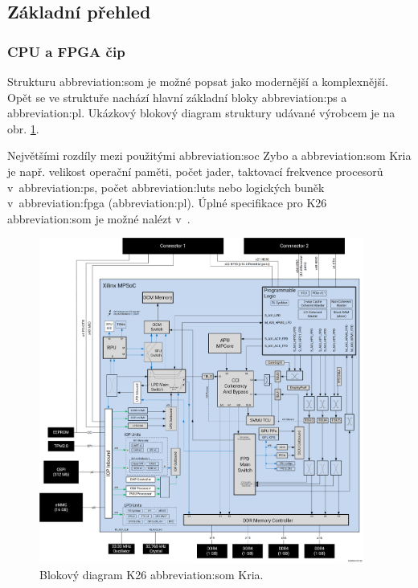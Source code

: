 \documentclass[a4paper, twoside, 11pt]{article}
\newcommand{\fbar}{\FloatBarrier}
\begin{document}
				\subsection{Základní přehled}
					\subsubsection{CPU a FPGA čip}
						Strukturu \gls{abbreviation:som} je možné popsat jako modernější a komplexnější. Opět se ve struktuře nachází hlavní základní bloky \gls{abbreviation:ps} a \gls{abbreviation:pl}. Ukázkový blokový diagram struktury udávané výrobcem je na obr. \ref{fig:xilinx-kria-k26-block-diagram}.\par
						Největšími rozdíly mezi použitými \gls{abbreviation:soc} Zybo a \gls{abbreviation:som} Kria je např. velikost operační paměti, počet jader, taktovací frekvence procesorů v~\gls{abbreviation:ps}, počet \gls{abbreviation:luts} nebo logických buněk v~\gls{abbreviation:fpga} (\gls{abbreviation:pl}). Úplné specifikace pro K26 \gls{abbreviation:som} je možné nalézt v~\cite{kria-k26-som-ds}.

						\begin{figure}[htbp!]
							\centering
								\includegraphics[width=0.95\textwidth]{src/jpg/xilinx-kria-k26-block-diagram.jpg} 
								\caption{Blokový diagram K26 \gls{abbreviation:som} Kria. \cite{kria-k26-som-ds}}
								\label{fig:xilinx-kria-k26-block-diagram}
						\end{figure}
						\fbar
\end{document}
